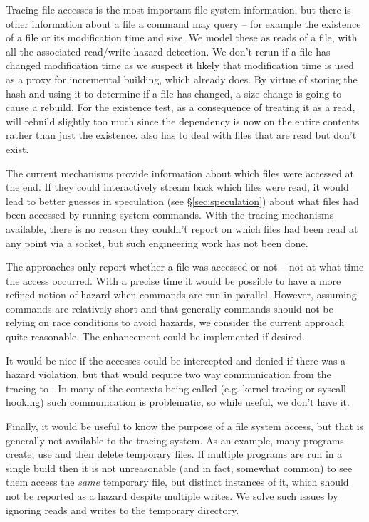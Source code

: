 Tracing file accesses is the most important file system information, but there is other information about a file a command may query -- for example the existence of a file or its modification time and size. We model these as reads of a file, with all the associated read/write hazard detection. %
We don't rerun if a file has changed modification time as we suspect it likely that modification time is used as a proxy for incremental building, which \Rattle already does. By virtue of \Rattle storing the hash and using it to determine if a file has changed, a size change is going to cause a rebuild. For the existence test, as a consequence of treating it as a read, \Rattle will rebuild slightly too much since the dependency is now on the entire contents rather than just the existence.  \Rattle also has to deal with files that are read but don't exist.



The current mechanisms provide information about which files were accessed at the end. If they could interactively stream back which files were read, it would lead to better guesses in speculation (see \S\ref{sec:speculation}) about what files had been accessed by running system commands. With the tracing mechanisms available, there is no reason they couldn't report on which files had been read at any point via a socket, but such engineering work has not been done.

The approaches only report whether a file was accessed or not -- not at what time the access occurred. With a precise time it would be possible to have a more refined notion of hazard when commands are run in parallel. However, assuming commands are relatively short and that generally commands should not be relying on race conditions to avoid hazards, we consider the current approach quite reasonable. The enhancement could be implemented if desired.

It would be nice if the accesses could be intercepted and denied if there was a hazard violation, but that would require two way communication from the tracing to \Rattle. In many of the contexts being called (e.g. kernel tracing or syscall hooking) such communication is problematic, so while useful, we don't have it.

Finally, it would be useful to know the purpose of a file system access, but that is generally not available to the tracing system. As an example, many programs create, use and then delete temporary files. If multiple programs are run in a single \Rattle build then it is not unreasonable (and in fact, somewhat common) to see them access the \emph{same} temporary file, but distinct instances of it, which should not be reported as a hazard despite multiple writes. We solve such issues by ignoring reads and writes to the temporary directory.

